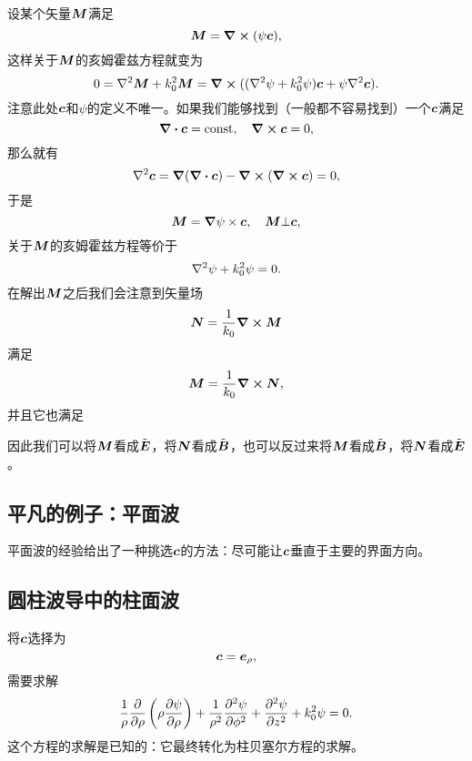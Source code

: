 设某个矢量$\vb*{M}$满足
\begin{equation}
    {\vb*{M}} = \curl{(\psi \vb*{c})},
\end{equation}
这样关于$\vb*{M}$的亥姆霍兹方程就变为
\[
    0 = \laplacian {\vb*{M}} + k_0^2 {\vb*{M}} = \curl{((\laplacian \psi + k_0^2 \psi) \vb*{c} + \psi \laplacian \vb*{c})}.
\]
注意此处$\vb*{c}$和$\psi$的定义不唯一。如果我们能够找到（一般都不容易找到）一个$\vb*{c}$满足
\begin{equation}
    \div{\vb*{c}} = \text{const}, \quad \curl{\vb*{c}} = 0,
\end{equation}
那么就有
\[
    \laplacian \vb*{c} = \grad(\div{\vb*{c}}) - \curl{(\curl{\vb*{c}})} = 0,
\]
于是
\begin{equation}
    \vb*{M} = \grad{\psi} \times \vb*{c}, \quad \vb*{M} \bot \vb*{c},
\end{equation}
关于$\vb*{M}$的亥姆霍兹方程等价于
\begin{equation}
    \laplacian \psi + k_0^2 \psi = 0.
\end{equation}
在解出$\vb*{M}$之后我们会注意到矢量场
\begin{equation}
    \vb*{N} = \frac{1}{k_0} \curl{\vb*{M}}
\end{equation}
满足
\begin{equation}
    \vb*{M} = \frac{1}{k_0} \curl{\vb*{N}}, 
\end{equation}
并且它也满足

因此我们可以将$\vb*{M}$看成$\tilde{\vb*{E}}$，将$\vb*{N}$看成$\tilde{\vb*{B}}$，也可以反过来将$\vb*{M}$看成$\tilde{\vb*{B}}$，将$\vb*{N}$看成$\tilde{\vb*{E}}$。

\subsection{平凡的例子：平面波}

平面波的经验给出了一种挑选$\vb*{c}$的方法：尽可能让$\vb*{c}$垂直于主要的界面方向。

\subsection{圆柱波导中的柱面波}

将$\vb*{c}$选择为
\begin{equation}
    \vb*{c} = \vb*{e}_\rho,
\end{equation}
需要求解
\begin{equation}
    \frac{1}{\rho} \pdv{\rho} \left( \rho \pdv{\psi}{\rho} \right) + \frac{1}{\rho^2} \pdv[2]{\psi}{\phi} + \pdv[2]{\psi}{z} + k_0^2 \psi = 0.
\end{equation}
这个方程的求解是已知的：它最终转化为柱贝塞尔方程的求解。

